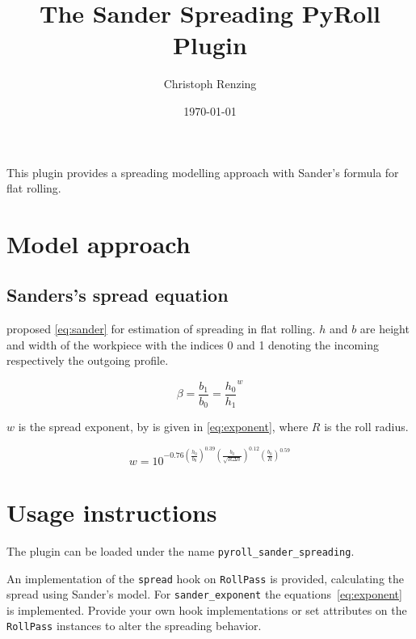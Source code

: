 \documentclass[11pt]{PyRollDocs}
\begin{document}
    \title{The Sander Spreading PyRoll Plugin}
    \author{Christoph Renzing}
    \date{\today}

    \maketitle

    This plugin provides a spreading modelling approach with Sander's formula for flat rolling.


    \section{Model approach}\label{sec:model-approach}

    \subsection{Sanders's spread equation}\label{subsec:sander's-spread-equation}

    \textcite{Sander1976, Sander1978} proposed \autoref{eq:sander} for estimation of spreading in flat rolling.
    $h$ and $b$ are height and width of the workpiece with the indices 0 and 1 denoting the incoming respectively the outgoing profile.

    \begin{equation}
        \beta = \frac{b_1}{b_0} = \frac{h_0}{h_1} ^{w}
        \label{eq:sander}
    \end{equation}
    
    $w$ is the spread exponent, by \textcite{Sander1976} is given in \autoref{eq:exponent}, where $R$ is the roll radius.

    \begin{equation}
        w = 10^{ -0.76 \left( \frac{h_0}{b_0} \right)^{0.39} \left(\frac{b_0}{\sqrt{R \Delta h}} \right)^{0.12} \left( \frac{b_0}{R} \right)^{0.59} }
        \label{eq:exponent}
    \end{equation}


    \section{Usage instructions}\label{sec:usage-instructions}

    The plugin can be loaded under the name \texttt{pyroll\_sander\_spreading}.

    An implementation of the \lstinline{spread} hook on \lstinline{RollPass} is provided, calculating the spread using Sander's model.
    For \lstinline{sander_exponent} the equations~\ref{eq:exponent} is implemented.
    Provide your own hook implementations or set attributes on the \lstinline{RollPass} instances to alter the spreading behavior.

    \printbibliography
\end{document}
